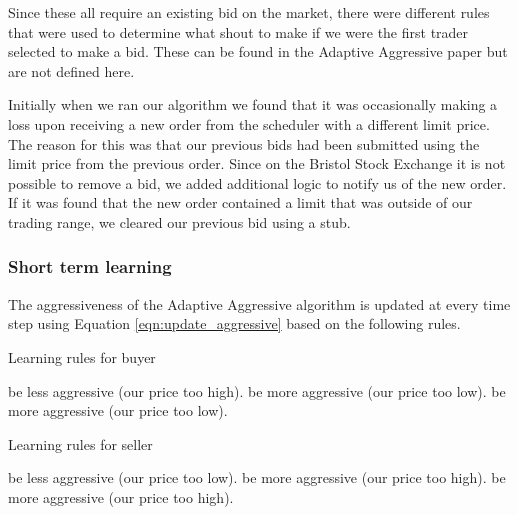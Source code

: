 \documentclass[preprint]{acm_proc_article-sp} %
\begin{document}
Since these all require an existing bid on the market, there were different
rules that were used to determine what shout to make if we were the first
trader selected to make a bid. These can be found in the Adaptive Aggressive
paper\cite[p.~32]{AA_paper} but are not defined here.

Initially when we ran our algorithm we found that it was occasionally making a
loss upon receiving a new order from the scheduler with a different limit
price. The reason for this was that our previous bids had been submitted using
the limit price from the previous order. Since on the Bristol Stock Exchange it
is not possible to remove a bid, we added additional logic to notify us of the
new order. If it was found that the new order contained a limit that was
outside of our trading range, we cleared our previous bid using a stub.\\


\subsubsection{Short term learning} \label{sec:AA_short_term_learning}
The aggressiveness of the Adaptive Aggressive algorithm is updated at every
time step using Equation \ref{eqn:update_aggressive} based on the following rules.

\begin{algorithm}[H]
\label{alg:learning_rules_buyer}
\caption{Learning rules for buyer}
\begin{algorithmic}
            \STATE be less aggressive (our price too high).
        \ELSE
            \STATE be more aggressive (our price too low).
        \ENDIF
        \STATE be more aggressive (our price too low).
    \ENDIF
\end{algorithmic}
\end{algorithm}

\begin{algorithm}[h]
\label{alg:learning_rules_seller}
\caption{Learning rules for seller}
\begin{algorithmic}
            \STATE be less aggressive (our price too low).
        \ELSE
            \STATE be more aggressive (our price too high).
        \ENDIF
        \STATE be more aggressive (our price too high).
    \ENDIF
\end{algorithmic}
\end{algorithm}
\end{document}
